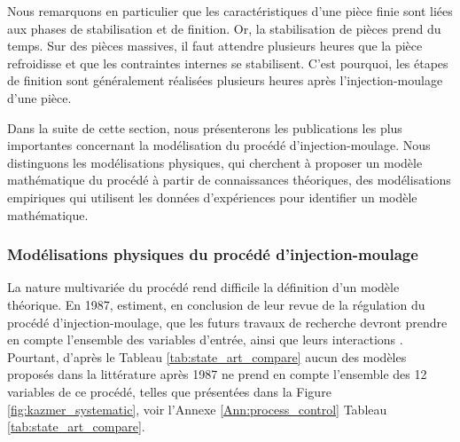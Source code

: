 Nous remarquons en particulier que les caractéristiques d'une pièce finie sont liées aux phases de stabilisation et de finition.
Or, la stabilisation de pièces prend du temps.
Sur des pièces massives, il faut attendre plusieurs heures que la pièce refroidisse et que les contraintes internes se stabilisent.
C'est pourquoi, les étapes de finition sont généralement réalisées plusieurs heures après l'injection-moulage d'une pièce.

Dans la suite de cette section, nous présenterons les publications les plus importantes concernant la modélisation du procédé d'injection-moulage.
Nous distinguons les modélisations physiques, qui cherchent à proposer un modèle mathématique du procédé à partir de connaissances théoriques, des modélisations empiriques qui utilisent les données d'expériences pour identifier un modèle mathématique.


\subsubsection{Modélisations physiques du procédé d'injection-moulage} \label{subsubsec:molding_theory}
La nature multivariée du procédé rend difficile la définition d'un modèle théorique.
En 1987, \citeauthor{agrawal_injection-molding_1987} estiment, en conclusion de leur revue de la régulation du procédé d'injection-moulage, que les futurs travaux de recherche devront prendre en compte l’ensemble des variables d'entrée, ainsi que leurs interactions \cite{agrawal_injection-molding_1987}.
Pourtant, d'après le Tableau \ref{tab:state_art_compare} aucun des modèles proposés dans la littérature après 1987 ne prend en compte l'ensemble des 12 variables de ce procédé, telles que présentées dans la Figure \ref{fig:kazmer_systematic}, voir l'Annexe \ref{Ann:process_control} Tableau \ref{tab:state_art_compare}.


